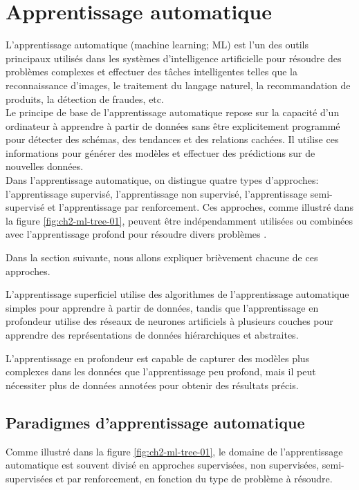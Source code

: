 \section{Apprentissage automatique}
L'apprentissage automatique (machine learning; ML) est l'un des outils principaux utilisés dans les systèmes d'intelligence artificielle pour résoudre des problèmes complexes et effectuer des tâches intelligentes telles que la reconnaissance d'images, le traitement du langage naturel, la recommandation de produits, la détection de fraudes, etc.
\\
Le principe de base de l'apprentissage automatique repose sur la capacité d'un ordinateur à apprendre à partir de données sans être explicitement programmé
pour détecter des schémas, des tendances et des relations cachées. Il utilise ces informations pour générer des modèles et effectuer des prédictions sur de nouvelles données.
\\
Dans l'apprentissage automatique, on distingue quatre types d'approches: l'apprentissage supervisé, l'apprentissage non supervisé, l'apprentissage semi-supervisé et l'apprentissage par renforcement. Ces approches, comme illustré dans la figure \ref{fig:ch2-ml-tree-01}, peuvent être indépendamment utilisées ou combinées avec l'apprentissage profond pour résoudre divers problèmes \cite{ch_Deep_Learning}.

Dans la section suivante, nous allons expliquer brièvement chacune de ces approches.

L'apprentissage superficiel utilise des algorithmes de l’apprentissage automatique simples pour apprendre à partir de données, tandis que l'apprentissage en profondeur utilise des réseaux de neurones artificiels à plusieurs couches pour apprendre des représentations de données hiérarchiques et abstraites. 

L'apprentissage en profondeur est capable de capturer des modèles plus complexes dans les données que l'apprentissage peu profond, mais il peut nécessiter plus de données annotées pour obtenir des résultats précis.

\subsection{Paradigmes d'apprentissage automatique}
Comme illustré dans la figure \ref{fig:ch2-ml-tree-01}, le domaine de l’apprentissage automatique est souvent divisé en approches supervisées, non supervisées, semi-supervisées et par renforcement, en fonction du type de problème à résoudre.

